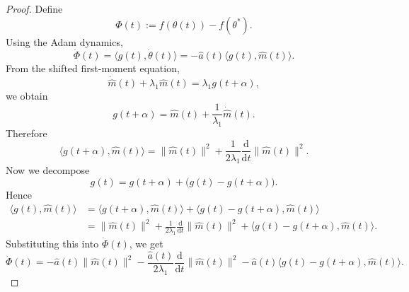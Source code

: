 \documentclass{article} %
\begin{document}
\begin{proof}
Define
\[
    \Phi(t):=f(\theta(t))-f(\theta^*).
\]
Using the Adam dynamics,
\[
    \dot\Phi(t)
    =
    \langle g(t),\dot\theta(t)\rangle
    =
    -
    \widehat a(t)
    \langle g(t),\widehat m(t)\rangle.
\]
From the shifted first-moment equation,
\[
    \dot{\widehat m}(t)+\lambda_1\widehat m(t)
    =
    \lambda_1g(t+\alpha),
\]
we obtain
\[
    g(t+\alpha)
    =
    \widehat m(t)+\frac1{\lambda_1}\dot{\widehat m}(t).
\]
Therefore
\[
    \langle g(t+\alpha),\widehat m(t)\rangle
    =
    \|\widehat m(t)\|^2
    +
    \frac1{2\lambda_1}
    \frac{\mathrm d}{\mathrm dt}\|\widehat m(t)\|^2.
\]
Now we decompose
\[
    g(t)
    =
    g(t+\alpha)
    +
    \bigl(g(t)-g(t+\alpha)\bigr).
\]
Hence
\[
\begin{aligned}
    \langle g(t),\widehat m(t)\rangle
    &=
    \langle g(t+\alpha),\widehat m(t)\rangle
    +
    \langle g(t)-g(t+\alpha),\widehat m(t)\rangle\\
    &=
    \|\widehat m(t)\|^2
    +
    \frac1{2\lambda_1}
    \frac{\mathrm d}{\mathrm dt}\|\widehat m(t)\|^2
    +
    \langle g(t)-g(t+\alpha),\widehat m(t)\rangle.
\end{aligned}
\]
Substituting this into \(\dot\Phi(t)\), we get
\begin{equation}\label{eq:Phi_dot_shifted}
    \dot\Phi(t)
    =
    -
    \widehat a(t)\|\widehat m(t)\|^2
    -
    \frac{\widehat a(t)}{2\lambda_1}
    \frac{\mathrm d}{\mathrm dt}\|\widehat m(t)\|^2
    -
    \widehat a(t)
    \langle g(t)-g(t+\alpha),\widehat m(t)\rangle.
\end{equation}


\end{proof}
\end{document}
